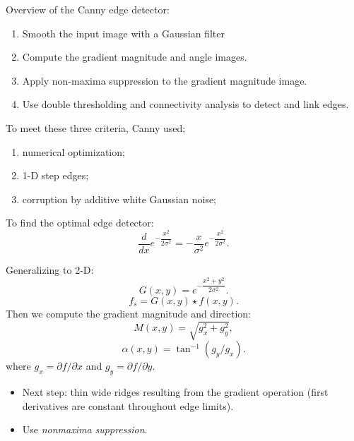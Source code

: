 \begin{frame}
Overview of the Canny edge detector:
\begin{enumerate}
\item Smooth the input image with a Gaussian filter
\item Compute the gradient magnitude and angle images.
\item Apply non-maxima suppression to the gradient magnitude image.
\item Use double thresholding and connectivity analysis to detect and link edges.
\end{enumerate}
\end{frame}

\begin{frame}
To meet these three criteria, Canny used;
\begin{enumerate}
\item numerical optimization;
\item 1-D step edges;
\item corruption by additive white Gaussian noise;
\end{enumerate}
%
To find the optimal edge detector:
\[
\dfrac{d}{dx}e^{-\dfrac{x^{2}}{2\sigma^{2}}} = -\dfrac{x}{\sigma^2} e ^{-\dfrac{x^{2}}{2\sigma^{2}}}.
\]
\end{frame}

\begin{frame}
Generalizing to 2-D:
\[
G(x,y) = e^{-\dfrac{x^{2}+y^{2}}{2\sigma^{2}}}.
\]
\[
f_{s} = G(x,y) \star f(x,y).
\]
Then we compute the gradient magnitude and direction:
\[
M(x,y) = \sqrt{ g_{x}^{2} + g_{y}^{2} },
\]
\[
\alpha(x,y) = \tan^{-1}(g_{y}/g_{x}).
\]
where $g_{x} = \partial f / \partial x$ and $g_{y} = \partial f / \partial y$.
\end{frame}

\begin{frame}
\begin{itemize}
\item Next step: thin wide ridges resulting from the gradient operation (first derivatives are constant throughout edge limits).
\item Use \textit{nonmaxima suppression}.
\end{itemize}
\end{frame}

